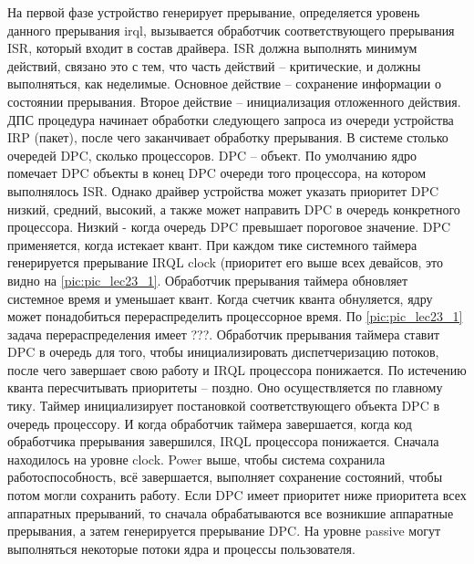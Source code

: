 На первой фазе  устройство генерирует прерывание, определяется уровень данного прерывания irql, вызывается обработчик соответствующего прерывания ISR, который входит в состав драйвера. ISR должна выполнять минимум действий, связано это с тем, что часть действий – критические, и должны выполняться, как неделимые.  Основное действие – сохранение информации о состоянии прерывания. Второе действие – инициализация отложенного действия.
ДПС процедура начинает обработки следующего запроса из очереди устройства IRP (пакет), после чего заканчивает обработку прерывания. В системе столько очередей DPC, сколько процессоров. DPC – объект. По умолчанию ядро помечает DPC объекты в конец DPC очереди того процессора, на котором выполнялось ISR. Однако драйвер устройства может указать приоритет DPC {низкий, средний, высокий}, а также может направить DPC в очередь конкретного процессора.  Низкий - когда очередь DPC превышает пороговое значение. DPC применяется, когда истекает квант. При каждом тике системного таймера генерируется прерывание IRQL clock (приоритет его выше всех девайсов, это видно на \ref{pic:pic_lec23_1}. Обработчик прерывания таймера обновляет системное время и уменьшает квант. Когда счетчик кванта обнуляется, ядру может понадобиться перераспределить процессорное время. По \ref{pic:pic_lec23_1} задача перераспределения имеет ???. Обработчик прерывания таймера ставит DPC  в очередь для того, чтобы инициализировать диспетчеризацию потоков, после чего завершает свою работу и IRQL процессора понижается. По истечению кванта пересчитывать приоритеты – поздно. Оно осуществляется по главному тику. Таймер инициализирует постановкой соответствующего объекта DPC в очередь процессору. И когда обработчик таймера завершается, когда код обработчика прерывания завершился, IRQL процессора понижается. Сначала находилось на уровне clock. Power выше, чтобы система сохранила работоспособность,  всё завершается, выполняет сохранение состояний, чтобы потом могли сохранить работу. Если DPC имеет приоритет ниже приоритета всех аппаратных прерываний, то сначала обрабатываются все возникшие аппаратные прерывания, а затем генерируется прерывание DPC. На уровне passive могут выполняться некоторые потоки ядра и процессы пользователя.
